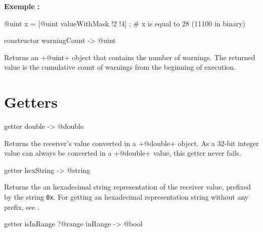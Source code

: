 \textbf{Exemple :}
\begin{galgascode}
@uint x = [@uint valueWithMask !2 !4] ; # x is equal to 28 (11100 in binary)
\end{galgascode}





\begin{galgascode}
constructor warningCount -> @uint
\end{galgascode}


Returns an \ggs+@uint+ object that contains the number of warnings. The returned value is the cumulative count of warnings from the beginning of execution.

\section{Getters}


\begin{galgascode}
getter double -> @double
\end{galgascode}

Returns the receiver's value converted in a \ggs+@double+ object. As a 32-bit integer value can always be converted in a \ggs+@double+ value, this getter never fails.




\begin{galgascode}
getter hexString -> @string
\end{galgascode}

Returns the an hexadecimal string representation of the receiver value, prefixed by the string \texttt{0x}. For getting an hexadecimal representation string without any prefix, see .




\begin{galgascode}
getter isInRange ?@range inRange -> @bool
\end{galgascode}


